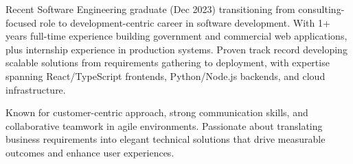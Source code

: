 

\begin{cvparagraph}

Recent Software Engineering graduate (Dec 2023) transitioning from consulting-focused role to development-centric career in software development. With 1+ years full-time experience building government and commercial web applications, plus internship experience in production systems. Proven track record developing scalable solutions from requirements gathering to deployment, with expertise spanning React/TypeScript frontends, Python/Node.js backends, and cloud infrastructure.

Known for customer-centric approach, strong communication skills, and collaborative teamwork in agile environments. Passionate about translating business requirements into elegant technical solutions that drive measurable outcomes and enhance user experiences. 
\end{cvparagraph}
